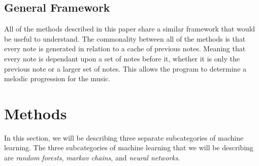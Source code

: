 \documentclass{sig-alternate}
\begin{document}
\subsection{General Framework}
\label{sec:framework}
	All of the methods described in this paper share a similar framework that would be useful to understand. The commonality between all of the methods is that every note is generated in relation to a cache of previous notes. Meaning that every note is dependant upon a set of notes before it, whether it is only the previous note or a larger set of notes. This allows the program to determine a melodic progression for the music.

\section{Methods}
\label{sec:methods}

	In this section, we will be describing three separate subcategories of machine learning. The three subcategories of machine learning that we will be describing are \textit{random forests},\textit{ markov chains}, and \textit{neural networks}.

\end{document}
